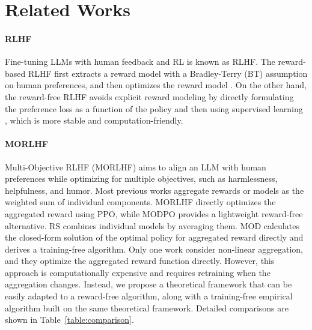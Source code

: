 \section{Related Works}
\paragraph{RLHF}
Fine-tuning LLMs with human feedback and RL is known as RLHF. The reward-based RLHF first extracts a reward model with a Bradley-Terry (BT) assumption on human preferences, and then optimizes the reward model \citep{ouyang2022training,bai2022training,touvron2023llama,azar2024general}. On the other hand, the reward-free RLHF avoids explicit reward modeling by directly formulating the preference loss as a function of the policy and then using supervised learning \citep{wang2023beyond,rafailov2024direct}, which is more stable and computation-friendly. 
\paragraph{MORLHF}
Multi-Objective RLHF (MORLHF) aims to align an LLM with human preferences while optimizing for multiple objectives, such as harmlessness, helpfulness, and humor. Most previous works aggregate rewards or models as the weighted sum of individual components. MORLHF \citep{wu2023fine,bai2022training} directly optimizes the aggregated reward using PPO, while MODPO \citep{zhou2023beyond} provides a lightweight reward-free alternative. RS \citep{rame2024rewarded} combines individual models by averaging them. MOD \citep{shi2024decoding} calculates the closed-form solution of the optimal policy for aggregated reward directly and derives a training-free algorithm. Only one work \citep{zhong2024provable} consider non-linear aggregation, and they optimize the aggregated reward function directly. However, this approach is computationally expensive and requires retraining when the aggregation changes. Instead, we propose a theoretical framework that can be easily adapted to a reward-free algorithm,  along with a training-free empirical algorithm built on the same theoretical framework. Detailed comparisons are shown in Table~\ref{table:comparison}.

